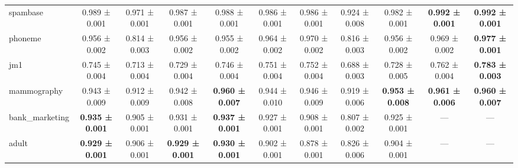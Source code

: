 \begin{table}[H]
{\begin{tabular}{lcccccccccc}
    spambase & 0.989 ± 0.001 & 0.971 ± 0.001 & 0.987 ± 0.001 & 0.988 ± 0.001 & 0.986 ± 0.001 & 0.986 ± 0.001 & 0.924 ± 0.008 & 0.982 ± 0.001 & \textbf{0.992 ± 0.001} & \textbf{0.992 ± 0.001} \\
    phoneme & 0.956 ± 0.002 & 0.814 ± 0.003 & 0.956 ± 0.002 & 0.955 ± 0.002 & 0.964 ± 0.002 & 0.970 ± 0.002 & 0.816 ± 0.003 & 0.956 ± 0.002 & 0.969 ± 0.002 & \textbf{0.977 ± 0.001} \\
    jm1 & 0.745 ± 0.004 & 0.713 ± 0.004 & 0.729 ± 0.004 & 0.746 ± 0.004 & 0.751 ± 0.004 & 0.752 ± 0.004 & 0.688 ± 0.003 & 0.728 ± 0.005 & 0.762 ± 0.004 & \textbf{0.783 ± 0.003} \\
    mammography & 0.943 ± 0.009 & 0.912 ± 0.009 & 0.942 ± 0.008 & \textbf{0.960 ± 0.007} & 0.944 ± 0.010 & 0.946 ± 0.009 & 0.919 ± 0.006 & \textbf{0.953 ± 0.008} & \textbf{0.961 ± 0.006} & \textbf{0.960 ± 0.007} \\
    bank\_marketing & \textbf{0.935 ± 0.001} & 0.905 ± 0.001 & 0.931 ± 0.001 & \textbf{0.937 ± 0.001} & 0.927 ± 0.001 & 0.908 ± 0.001 & 0.807 ± 0.002 & 0.925 ± 0.001 & — & — \\
    adult & \textbf{0.929 ± 0.001} & 0.906 ± 0.001 & \textbf{0.929 ± 0.001} & \textbf{0.930 ± 0.001} & 0.902 ± 0.001 & 0.878 ± 0.001 & 0.826 ± 0.006 & 0.904 ± 0.001 & — & — \\
    \bottomrule
\end{tabular}
    }
\end{table}
